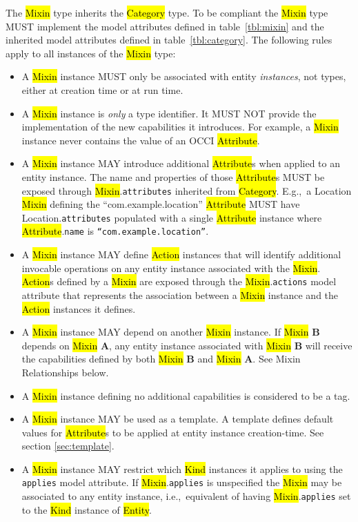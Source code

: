 \documentclass[10pt,a4paper]{article}
\begin{document}
The \hl{Mixin} type inherits the \hl{Category} type. To be compliant
the \hl{Mixin} type MUST implement the model attributes defined in
table~\ref{tbl:mixin} and the inherited model attributes defined in
table~\ref{tbl:category}. The following rules apply to all instances
of the \hl{Mixin} type:
%
\begin{itemize}
  \item A \hl{Mixin} instance MUST only be associated with entity
    {\em instances}, not types, either at creation time or at run time.

  \item A \hl{Mixin} instance is {\em only} a type identifier. It MUST NOT
    provide the implementation of the new capabilities it introduces.
    For example, a \hl{Mixin} instance never contains the value of an OCCI
    \hl{Attribute}.

  \item A \hl{Mixin} instance MAY introduce additional \hl{Attribute}s
    when applied to an entity instance. The name and properties of those
    \hl{Attribute}s MUST be exposed through \hl{Mixin}.{\tt attributes}
    inherited from \hl{Category}.  E.g.,~a Location
    \hl{Mixin} defining the ``com.example.location'' \hl{Attribute} MUST
    have Location.{\tt attributes} populated with a single \hl{Attribute}
    instance where \hl{Attribute}.{\tt name} is {\tt ``com.example.location''}.

  \item A \hl{Mixin} instance MAY define \hl{Action} instances that will
    identify additional invocable operations on any entity instance
    associated with the
    \hl{Mixin}.  \hl{Action}s defined by a \hl{Mixin} are exposed
    through the \hl{Mixin}.{\tt actions} model attribute that represents the
    association between a \hl{Mixin} instance and the \hl{Action} instances it
    defines.

  \item A \hl{Mixin} instance MAY depend on another \hl{Mixin}
    instance.  If \hl{Mixin} {\bf B} depends on \hl{Mixin} {\bf A},
    any entity instance associated with \hl{Mixin} {\bf B} will
    receive the capabilities defined by both \hl{Mixin} {\bf
      B} and \hl{Mixin} {\bf A}.  See Mixin Relationships below.

  \item A \hl{Mixin} instance defining no additional
    capabilities is considered to be a tag.

  \item A \hl{Mixin} instance MAY be used as a template. A template
    defines default values for \hl{Attribute}s to be applied at entity instance
    creation-time. See section \ref{sec:template}.

  \item A \hl{Mixin} instance MAY restrict which \hl{Kind} instances it applies
    to using the {\tt applies} model attribute.  If \hl{Mixin}.{\tt applies}
    is unspecified the \hl{Mixin} may be associated to any entity instance,
    i.e.,~equivalent of having \hl{Mixin}.{\tt applies} set to the \hl{Kind}
    instance of \hl{Entity}.

\end{itemize}
\end{document}
